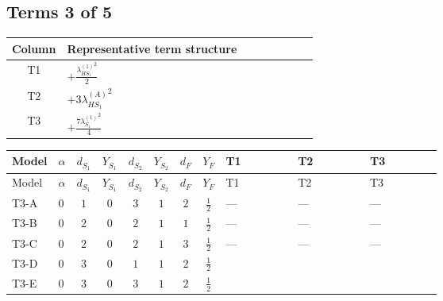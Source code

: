 \documentclass[8pt]{article}
\begin{document}
\begin{landscape}
\subsection*{Terms 3 of 5}
\begin{center}
\begin{tabular}{@{}c >{\raggedright\arraybackslash}p{0.82\linewidth}@{}}
\toprule
Column & Representative term structure \\
\midrule
T1 & \(\displaystyle +\frac{{\lambda_{HS_1}^{(1)}}^2}{2}\) \\
\midrule
T2 & \(\displaystyle +3 {\lambda_{HS_1}^{(A)}}^2\) \\
\midrule
T3 & \(\displaystyle +\frac{7 {\lambda_{S_1}^{(1)}}^2}{4}\) \\
\midrule
\bottomrule
\end{tabular}
\end{center}
\smallskip
\tiny
\begin{longtable}{@{}llcccccc >{\raggedright\arraybackslash}p{0.21\linewidth} >{\raggedright\arraybackslash}p{0.21\linewidth} >{\raggedright\arraybackslash}p{0.21\linewidth}@{}}
\toprule
Model & $\alpha$ & $d_{S_1}$ & $Y_{S_1}$ & $d_{S_2}$ & $Y_{S_2}$ & $d_F$ & $Y_F$ & T1 & T2 & T3 \\
\midrule
\endfirsthead
\toprule
Model & $\alpha$ & $d_{S_1}$ & $Y_{S_1}$ & $d_{S_2}$ & $Y_{S_2}$ & $d_F$ & $Y_F$ & T1 & T2 & T3 \\
\midrule
\endhead
T3-A & $0$ & $1$ & $0$ & $3$ & $1$ & $2$ & $\frac{1}{2}$ & --- & --- & --- \\
\midrule
T3-B & $0$ & $2$ & $0$ & $2$ & $1$ & $1$ & $\frac{1}{2}$ & --- & --- & --- \\
\midrule
T3-C & $0$ & $2$ & $0$ & $2$ & $1$ & $3$ & $\frac{1}{2}$ & --- & --- & --- \\
\midrule
T3-D & $0$ & $3$ & $0$ & $1$ & $1$ & $2$ & $\frac{1}{2}$ & \scriptsize\adjustbox{max width=\linewidth}{$\begin{gathered} +\frac{{\lambda_{HS_1}^{(1)}}^2}{2}\end{gathered}$} & \scriptsize\adjustbox{max width=\linewidth}{$\begin{gathered} +3 {\lambda_{HS_1}^{(A)}}^2\end{gathered}$} & \scriptsize\adjustbox{max width=\linewidth}{$\begin{gathered} +\frac{7 {\lambda_{S_1}^{(1)}}^2}{4}\end{gathered}$} \\
\midrule
T3-E & $0$ & $3$ & $0$ & $3$ & $1$ & $2$ & $\frac{1}{2}$ & \scriptsize\adjustbox{max width=\linewidth}{$\begin{gathered} +\frac{{\lambda_{HS_1}^{(1)}}^2}{2}\end{gathered}$} & \scriptsize\adjustbox{max width=\linewidth}{$\begin{gathered} +3 {\lambda_{HS_1}^{(A)}}^2\end{gathered}$} & \scriptsize\adjustbox{max width=\linewidth}{$\begin{gathered} +\frac{7 {\lambda_{S_1}^{(1)}}^2}{4}\end{gathered}$} \\

\end{longtable}
\end{landscape}
\end{document}
